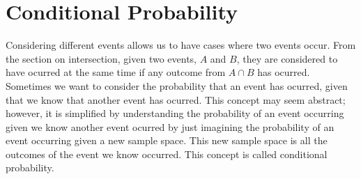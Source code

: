 \documentclass{report}
\begin{document}


        \section{Conditional Probability}
        Considering different events allows us to have cases where two events occur. From the section on intersection, given two events, $A$ and $B$, they are considered to have ocurred at the same time if any outcome from $A\cap B$ has ocurred. Sometimes we want to consider the probability that an event has ocurred, given that we know that another event has ocurred. This concept may seem abstract; however, it is simplified by understanding the probability of an event occurring given we know another event ocurred by just imagining the probability of an event occurring given a new sample space. This new sample space is all the outcomes of the event we know occurred. This concept is called conditional probability.
\end{document}
